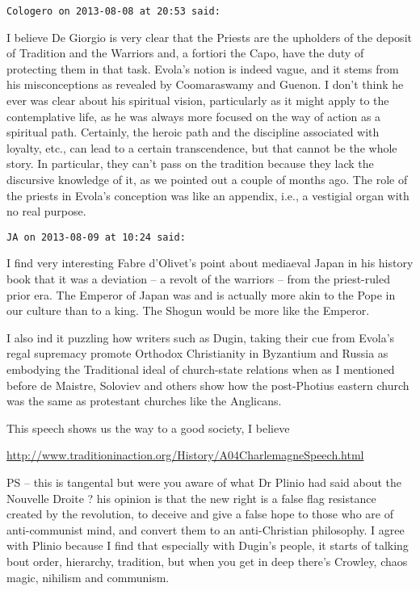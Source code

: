\begin{footnotesize}
\begin{sffamily}
\hfill

\texttt{Cologero on 2013-08-08 at 20:53 said: }

I believe De Giorgio is very clear that the Priests are the upholders of the deposit of Tradition and the Warriors and, a fortiori the Capo, have the duty of protecting them in that task. Evola's notion is indeed vague, and it stems from his misconceptions as revealed by Coomaraswamy and Guenon. I don't think he ever was clear about his spiritual vision, particularly as it might apply to the contemplative life, as he was always more focused on the way of action as a spiritual path. Certainly, the heroic path and the discipline associated with loyalty, etc., can lead to a certain transcendence, but that cannot be the whole story. In particular, they can't pass on the tradition because they lack the discursive knowledge of it, as we pointed out a couple of months ago. The role of the priests in Evola's conception was like an appendix, i.e., a vestigial organ with no real purpose.


\hfill

\texttt{JA on 2013-08-09 at 10:24 said: }

I find very interesting Fabre d'Olivet's point about mediaeval Japan in his history book that it was a deviation – a revolt of the warriors – from the priest-ruled prior era. The Emperor of Japan was and is actually more akin to the Pope in our culture than to a king. The Shogun would be more like the Emperor.

I also ind it puzzling how writers such as Dugin, taking their cue from Evola's regal supremacy promote Orthodox Christianity in Byzantium and Russia as embodying the Traditional ideal of church-state relations when as I mentioned before de Maistre, Soloviev and others show how the post-Photius eastern church was the same as protestant churches like the Anglicans. 

This speech shows us the way to a good society, I believe 

\url{http://www.traditioninaction.org/History/A04CharlemagneSpeech.html}

PS – this is tangental but were you aware of what Dr Plinio had said about the Nouvelle Droite ? his opinion is that the new right is a false flag resistance created by the revolution, to deceive and give a false hope to those who are of anti-communist mind, and convert them to an anti-Christian philosophy. I agree with Plinio because I find that especially with Dugin's people, it starts of talking bout order, hierarchy, tradition, but when you get in deep there's Crowley, chaos magic, nihilism and communism.



\end{sffamily}
\end{footnotesize}
